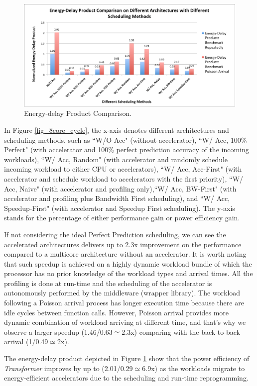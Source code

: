 \begin{figure}
    \centering
    \includegraphics[width=4.5in]{Energy-Delay-8core}
    \caption{Energy-delay Product Comparison.}
    \label{fig_8core_energy_delay}
\end{figure}

In Figure \ref{fig_8core_cycle}, the x-axis denotes different architectures and scheduling methods, such as ``W/O Acc" (without accelerator), ``W/ Acc, 100\% Perfect" (with accelerator and 100\% perfect prediction accuracy of the incoming workloads), ``W/ Acc, Random" (with accelerator and randomly schedule incoming workload to either CPU or accelerators), ``W/ Acc, Acc-First" (with accelerator and schedule workload to accelerators with the first priority), ``W/ Acc, Naive" (with accelerator and profiling only),``W/ Acc, BW-First" (with accelerator and profiling plus Bandwidth First scheduling), and ``W/ Acc, Speedup-First" (with accelerator and Speedup First scheduling). The y-axis stands for the percentage of either performance gain or power efficiency gain.

If not considering the ideal Perfect Prediction scheduling, we can see the accelerated
architectures delivers up to 2.3x improvement on the performance
compared to a multicore architecture without an accelerator. It is
worth noting that such speedup is achieved on a highly dynamic
workload bundle of which the processor has no prior knowledge of the
workload types and arrival times. All the profiling is done at run-time and the
scheduling of the accelerator is autonomously performed by the
middleware (wrapper library). The workload following a Poisson arrival
process has longer execution time because there are idle cycles
between function calls. However, Poisson arrival provides more dynamic
combination of workload arriving at different time, and that's why we
observe a larger speedup (1.46/0.63$\simeq$2.3x) comparing with the
back-to-back arrival (1/0.49$\simeq$2x). 

The energy-delay product depicted in Figure
\ref{fig_8core_energy_delay} show that the power efficiency of {\em
 Transformer} improves by up to (2.01/0.29$\simeq$6.9x) as the workloads migrate to
energy-efficient accelerators due to the scheduling and run-time
reprogramming.

